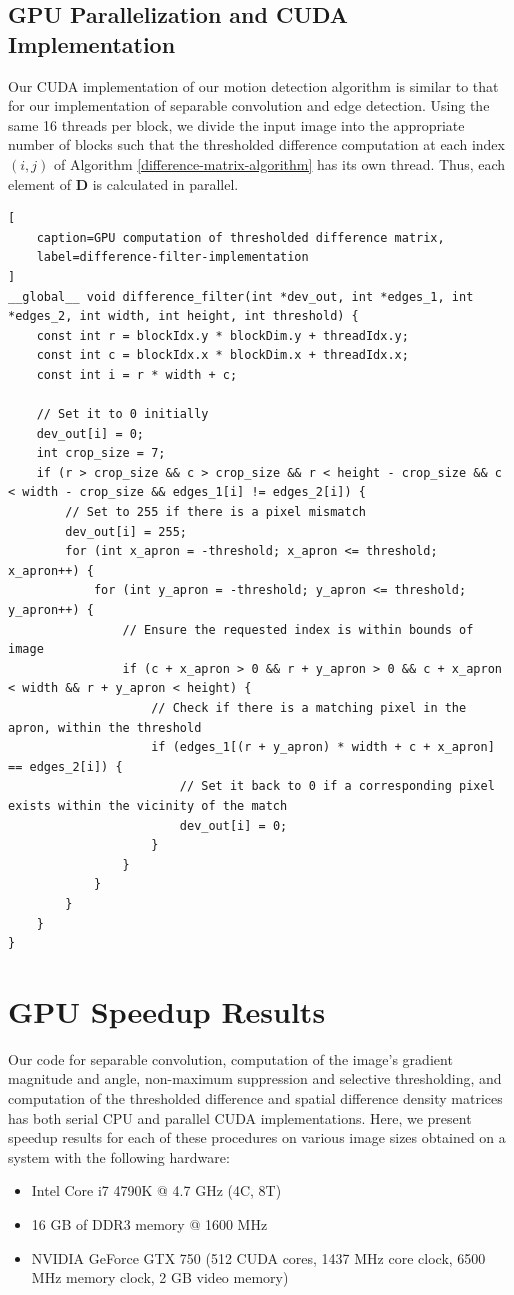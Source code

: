 \documentclass[journal]{IEEEtran}
\begin{document}
\subsection{GPU Parallelization and CUDA Implementation}
Our CUDA implementation of our motion detection algorithm is similar to that for our implementation of separable convolution and edge detection. Using the same 16 threads per block, we divide the input image into the appropriate number of blocks such that the thresholded difference computation at each index $(i, j)$ of Algorithm \ref{difference-matrix-algorithm} has its own thread. Thus, each element of $\boldsymbol{D}$ is calculated in parallel.
\begin{lstlisting}[
	caption=GPU computation of thresholded difference matrix,
	label=difference-filter-implementation
]
__global__ void difference_filter(int *dev_out, int *edges_1, int *edges_2, int width, int height, int threshold) {
	const int r = blockIdx.y * blockDim.y + threadIdx.y;
	const int c = blockIdx.x * blockDim.x + threadIdx.x;
	const int i = r * width + c;

    // Set it to 0 initially
    dev_out[i] = 0;
    int crop_size = 7;
    if (r > crop_size && c > crop_size && r < height - crop_size && c < width - crop_size && edges_1[i] != edges_2[i]) {
        // Set to 255 if there is a pixel mismatch
        dev_out[i] = 255;
        for (int x_apron = -threshold; x_apron <= threshold; x_apron++) {
            for (int y_apron = -threshold; y_apron <= threshold; y_apron++) {
                // Ensure the requested index is within bounds of image
                if (c + x_apron > 0 && r + y_apron > 0 && c + x_apron < width && r + y_apron < height) {
                    // Check if there is a matching pixel in the apron, within the threshold
                    if (edges_1[(r + y_apron) * width + c + x_apron] == edges_2[i]) {
                        // Set it back to 0 if a corresponding pixel exists within the vicinity of the match
                        dev_out[i] = 0;
                    }
                }
            }
        }
    }
}
\end{lstlisting}


\section{GPU Speedup Results}
Our code for separable convolution, computation of the image's gradient magnitude and angle, non-maximum suppression and selective thresholding, and computation of the thresholded difference and spatial difference density matrices has both serial CPU and parallel CUDA implementations. Here, we present speedup results for each of these procedures on various image sizes obtained on a system with the following hardware:
\begin{itemize}
	\item Intel Core i7 4790K @ 4.7 GHz (4C, 8T)
	\item 16 GB of DDR3 memory @ 1600 MHz
	\item NVIDIA GeForce GTX 750 (512 CUDA cores, 1437 MHz core clock, 6500 MHz memory clock, 2 GB video memory)
\end{itemize}
\end{document}
